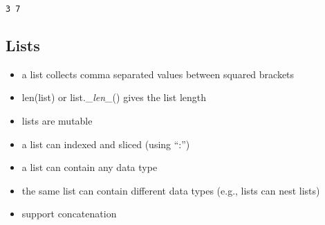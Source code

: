 \documentclass[11pt]{article}
\providecommand{\tightlist}{%
      \setlength{\itemsep}{0pt}\setlength{\parskip}{0pt}}
\begin{document}
    \begin{Verbatim}[commandchars=\\\{\}]
3 7
    \end{Verbatim}

    \hypertarget{lists}{%
\subsection{Lists}\label{lists}}

\begin{itemize}
\tightlist
\item
  a list collects comma separated values between squared brackets
\item
  len(list) or list.\_\emph{len\_}() gives the list length
\item
  lists are mutable
\item
  a list can indexed and sliced (using ``:'')
\item
  a list can contain any data type
\item
  the same list can contain different data types (e.g., lists can nest
  lists)
\item
  support concatenation
\end{itemize}
\end{document}
